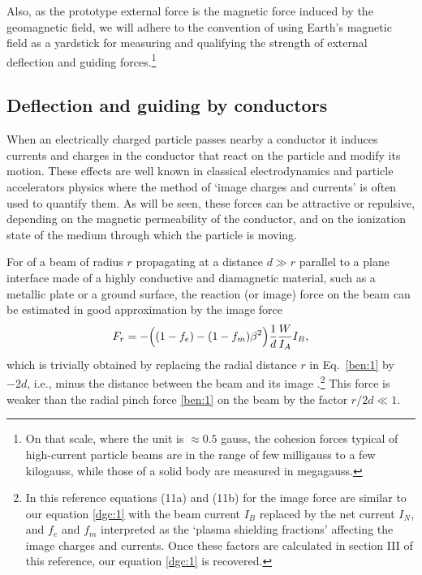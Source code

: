 \documentclass [12pt,a4paper,     ]{report} %
\begin{document}
   Also, as the prototype external force is the magnetic force induced by the geomagnetic field, we will adhere to the convention of using Earth's magnetic field as a yardstick for measuring and qualifying the strength of external deflection and guiding forces.\footnote{On that scale, where the unit is $\approx 0.5$ gauss, the cohesion forces typical of high-current particle beams are in the range of few milligauss to a few kilogauss, while those of a solid body are measured in megagauss.} 


\subsection{Deflection and guiding by conductors}

When an electrically charged particle passes nearby a conductor it induces currents and charges in the conductor that react on the particle and modify its motion.  These effects are well known in classical electrodynamics and particle accelerators physics where the method of `image charges and currents' is often used to quantify them.  As will be seen, these forces can be attractive or repulsive, depending on the magnetic permeability of the conductor, and on the ionization state of the medium through which the particle is moving.

For of a beam of radius $r$ propagating at a distance $d \gg r$ parallel to a  plane interface made of a highly conductive and diamagnetic material, such as a metallic plate or a ground surface, the reaction (or image) force on the beam can be estimated in good approximation by the image force \cite{LINK-1968-}
%
\begin{equation}\label{dgc:1} %
          F_{r} = -\Bigl( (1-f_e) - (1-f_m)\beta^2 \Bigr)
                   \frac{1}{d} \frac{W}{I_A} I_B,
\end{equation}
%
which is trivially obtained by replacing the radial distance $r$ in Eq.~\eqref{ben:1} by $-2d$, i.e., minus the distance between the beam and its image \cite{FERNS1991B}.\footnote{In this reference equations (11a) and (11b) for the image force are similar to our equation \eqref{dgc:1} with the beam current $I_B$ replaced by the net current $I_N$, and $f_e$ and $f_m$ interpreted as the `plasma shielding fractions' affecting the image charges and currents. Once these factors are calculated in section III of this reference, our equation \eqref{dgc:1} is recovered.}   This force is weaker than the radial pinch force \eqref{ben:1} on the beam by the factor $r/2d \ll 1$.
\end{document}

